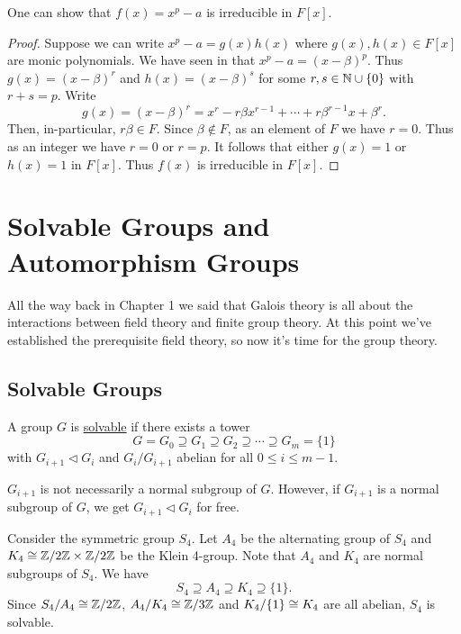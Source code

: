 \documentclass[11pt]{article}
\begin{document}
\begin{example}
    One can show that $f(x)=x^p-a$ is irreducible in $F[x]$.
\end{example}

\begin{proof}
    Suppose we can write $x^p-a=g(x)h(x)$ where $g(x),h(x)\in F[x]$ are monic polynomials. We have seen in  that $x^p-a=(x-\beta)^p$. Thus $g(x)=(x-\beta)^r$ and $h(x)=(x-\beta)^s$ for some $r,s\in\mathbb{N}\cup\{0\}$ with $r+s=p$. Write
    \[g(x)=(x-\beta)^r=x^r-r\beta x^{r-1}+\cdots+r\beta^{r-1}x+\beta^r.\]
    Then, in-particular, $r\beta\in F$. Since $\beta\not\in F$, as an element of $F$ we have $r=0$. Thus as an integer we have $r=0$ or $r=p$. It follows that either $g(x)=1$ or $h(x)=1$ in $F[x]$. Thus $f(x)$ is irreducible in $F[x]$.
    
\end{proof}

\pagebreak

\section{Solvable Groups and Automorphism Groups}

All the way back in Chapter 1 we said that Galois theory is all about the interactions between field theory and finite group theory. At this point we've established the prerequisite field theory, so now it's time for the group theory.

\subsection{Solvable Groups}

\begin{definition}
    A group $G$ is \ul{solvable} if there exists a tower
    \[G=G_0\supseteq G_1\supseteq G_2\supseteq\cdots\supseteq G_m=\{1\}\]
    with $G_{i+1}\lhd G_i$ and $G_i/G_{i+1}$ abelian for all $0\leq i\leq m-1$.
\end{definition}

\begin{remark}
    $G_{i+1}$ is not necessarily a normal subgroup of $G$. However, if $G_{i+1}$ is a normal subgroup of $G$, we get $G_{i+1}\lhd G_i$ for free.
\end{remark}

\begin{example}
    Consider the symmetric group $S_4$. Let $A_4$ be the alternating group of $S_4$ and $K_4\cong\mathbb{Z}/2\mathbb{Z}\times\mathbb{Z}/2\mathbb{Z}$ be the Klein 4-group. Note that $A_4$ and $K_4$ are normal subgroups of $S_4$. We have
    \[S_4\supseteq A_4\supseteq K_4\supseteq\{1\}.\]
    Since $S_4/A_4\cong\mathbb{Z}/2\mathbb{Z}$, $A_4/K_4\cong\mathbb{Z}/3\mathbb{Z}$ and $K_4/\{1\}\cong K_4$ are all abelian, $S_4$ is solvable.
\end{example}
\end{document}
